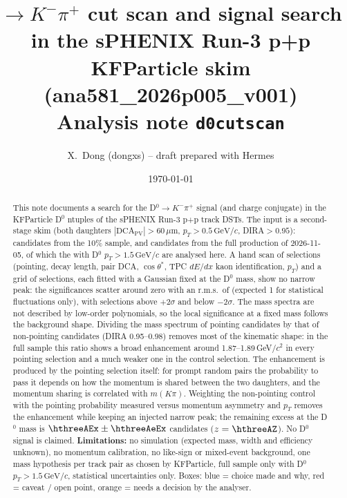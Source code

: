 \documentclass[11pt,a4paper]{article}
\title{\Dzero$\to K^-\pi^+$ cut scan and signal search\\
in the sPHENIX Run-3 p+p KFParticle \Dzero{} skim (ana581\_2026p005\_v001)\\[4pt]
\large Analysis note \texttt{d0cutscan}}
\author{X.~Dong (dongxs) \quad -- \quad draft prepared with Hermes}
\date{\today}
\newcommand{\Dzero}{D$^0$}
\newcommand{\pt}{\ensuremath{p_T}}
\newcommand{\um}{\ensuremath{\,\mu\mathrm{m}}}
\newcommand{\gevc}{\ensuremath{\,\mathrm{GeV}/c}}
\begin{document}
\maketitle

\begin{abstract}
\noindent
This note documents a search for the \Dzero$\to K^-\pi^+$ signal (and charge conjugate) in the KFParticle
\Dzero{} ntuples of the sPHENIX Run-3 p+p track DSTs. The input is a second-stage skim (both daughters
$|\mathrm{DCA}_\mathrm{PV}|>60\um$, \pt$>0.5\gevc$, DIRA$>0.95$): \nTen{} candidates from the 10\% sample, and
\fullOut{} candidates from the full production of 2026-11-05, of which the \nFull{} with \Dzero{} $\pt>1.5\gevc$ are
analysed here. A hand scan of \scanN{} selections (pointing, decay length, pair DCA, $\cos\theta^*$, TPC $dE/dx$ kaon
identification, \pt) and a grid of \gridN{} selections, each fitted with a Gaussian fixed at the \Dzero{} mass, show no
narrow peak: the significances scatter around zero with an r.m.s.\ of \gridRmsFifteen{} (expected 1 for statistical
fluctuations only), with \gridPosFifteen{} selections above $+2\sigma$ and \gridNegFifteen{} below $-2\sigma$. The mass
spectra are not described by low-order polynomials, so the local significance at a fixed mass follows the background
shape. Dividing the mass spectrum of pointing candidates by that of non-pointing candidates (DIRA 0.95--0.98) removes most
of the kinematic shape: in the full sample this ratio shows a broad enhancement around 1.87--1.89\,GeV/$c^2$ in every
pointing selection and a much weaker one in the control selection. The enhancement is
produced by the pointing selection itself: for prompt random pairs the probability to pass it depends on how the momentum
is shared between the two daughters, and the momentum sharing is correlated with $m(K\pi)$. Weighting the non-pointing
control with the pointing probability measured versus momentum asymmetry and \pt{} removes the enhancement while keeping an
injected narrow peak; the remaining excess at the \Dzero{} mass is $\hthreeAEx\pm\hthreeAeEx$ candidates ($z=\hthreeAZ$).
No \Dzero{} signal is claimed.
\textbf{Limitations:} no simulation (expected mass, width and efficiency unknown), no momentum calibration, no
like-sign or mixed-event background, one mass hypothesis per track pair as chosen by KFParticle, full sample only
with \Dzero{} $\pt>1.5\gevc$, statistical uncertainties only.
Boxes: \textcolor{blue!60!black}{blue} = choice made and why,
\textcolor{red!60!black}{red} = caveat / open point,
\textcolor{orange!80!black}{orange} = needs a decision by the analyser.
\end{abstract}

\tableofcontents
\clearpage












\end{document}
